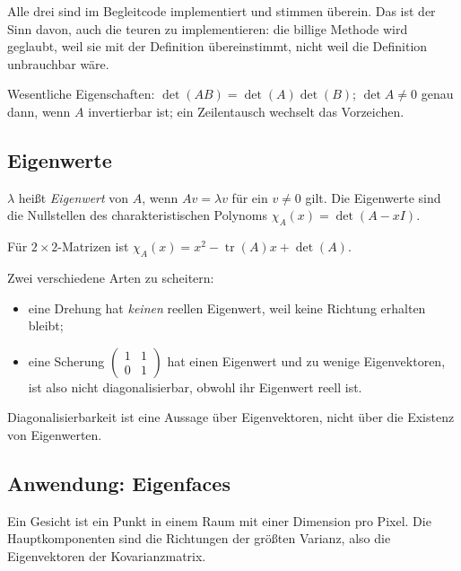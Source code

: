 \documentclass[12pt, a4paper]{article}
\begin{document}
Alle drei sind im Begleitcode implementiert und stimmen überein. Das ist der
Sinn davon, auch die teuren zu implementieren: die billige Methode wird
geglaubt, weil sie mit der Definition übereinstimmt, nicht weil die
Definition unbrauchbar wäre.

Wesentliche Eigenschaften: $\det(AB) = \det(A)\det(B)$; $\det A \neq 0$ genau
dann, wenn $A$ invertierbar ist; ein Zeilentausch wechselt das Vorzeichen.

\subsection{Eigenwerte}

\begin{definitionbox}
$\lambda$ heißt \emph{Eigenwert} von $A$, wenn $Av = \lambda v$ für ein
$v \neq 0$ gilt. Die Eigenwerte sind die Nullstellen des charakteristischen
Polynoms $\chi_A(x) = \det(A - xI)$.
\end{definitionbox}

Für $2 \times 2$-Matrizen ist $\chi_A(x) = x^2 - \operatorname{tr}(A) x +
\det(A)$.

Zwei verschiedene Arten zu scheitern:
\begin{itemize}
  \item eine Drehung hat \emph{keinen} reellen Eigenwert, weil keine Richtung
        erhalten bleibt;
  \item eine Scherung $\begin{pmatrix}1&1\\0&1\end{pmatrix}$ hat einen
        Eigenwert und zu wenige Eigenvektoren, ist also nicht
        diagonalisierbar, obwohl ihr Eigenwert reell ist.
\end{itemize}

Diagonalisierbarkeit ist eine Aussage über Eigenvektoren, nicht über die
Existenz von Eigenwerten.

\subsection{Anwendung: Eigenfaces}

Ein Gesicht ist ein Punkt in einem Raum mit einer Dimension pro Pixel. Die
Hauptkomponenten sind die Richtungen der größten Varianz, also die
Eigenvektoren der Kovarianzmatrix.
\end{document}
